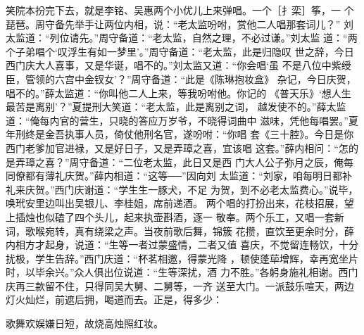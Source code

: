 笑院本扮完下去，就是李铭、吴惠两个小优儿上来弹唱。一个［扌栾］筝，一
个琵琶。周守备先举手让两位内相，说：“老太监吩咐，赏他二人唱那套词儿？”
刘太监道：“列位请先。”周守备道：“老太监，自然之理，不必过谦。”刘太监
道：“两个子弟唱个‘叹浮生有如一梦里’。”周守备道：“老太监，此是归隐叹
世之辞，今日西门庆大人喜事，又是华诞，唱不的。”刘太监又道：“你会唱‘虽
不是八位中紫绶臣，管领的六宫中金钗女’？”周守备道：“此是《陈琳抱妆盒》
杂记，今日庆贺，唱不的。”薛太监道：“你叫他二人上来，等我吩咐他。你记的
《普天乐》‘想人生最苦是离别’？”夏提刑大笑道：“老太监，此是离别之词，
越发使不的。”薛太监道：“俺每内官的营生，只晓的答应万岁爷，不晓得词曲中
滋味，凭他每唱罢。”夏年刑终是金吾执事人员，倚仗他刑名官，遂吩咐：“你唱
套《三十腔》。今日是你西门老爹加官进禄，又是好日子，又是弄璋之喜，宜该唱
这套。”薛内相问：“怎的是弄璋之喜？”周守备道：“二位老太监，此日又是西
门大人公子弥月之辰，俺每同僚都有薄礼庆贺。”薛内相道：“这等──”因向刘
太监道：“刘家，咱每明日都补礼来庆贺。”西门庆谢道：“学生生一豚犬，不足
为贺，到不必老太监费心。”说毕，唤玳安里边叫出吴银儿、李桂姐，席前递酒。
两个唱的打扮出来，花枝招展，望上插烛也似磕了四个头儿，起来执壶斟酒，逐一
敬奉。两个乐工，又唱一套新词，歌喉宛转，真有绕梁之声。当夜前歌后舞，锦簇
花攒，直饮至更余时分，薛内相方才起身，说道：“生等一者过蒙盛情，二者又值
喜庆，不觉留连畅饮，十分扰极，学生告辞。”西门庆道：“杯茗相邀，得蒙光降
，顿使蓬荜增辉，幸再宽坐片时，以毕余兴。”众人俱出位说道：“生等深扰，酒
力不胜。”各躬身施礼相谢。西门庆再三款留不住，只得同吴大舅、二舅等，一齐
送至大门。一派鼓乐喧天，两边灯火灿烂，前遮后拥，喝道而去。正是，得多少：

歌舞欢娱嫌日短，故烧高烛照红妆。